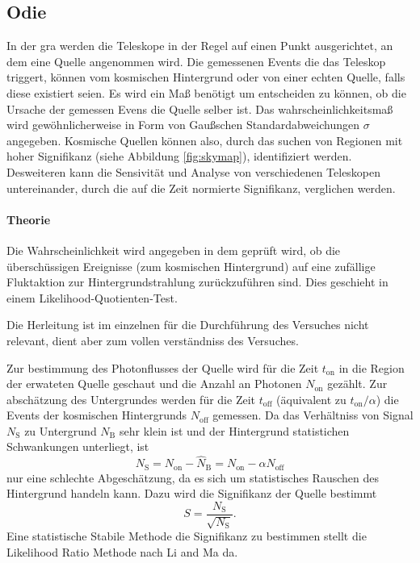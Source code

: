 \subsection{Odie}%
\label{sub:odie}
In der gra werden die Teleskope in der Regel auf einen Punkt 
ausgerichtet, an dem eine Quelle angenommen wird.
Die gemessenen Events die das Teleskop triggert, können vom 
kosmischen Hintergrund oder von einer echten Quelle, falls diese existiert seien.
Es wird ein Maß benötigt um entscheiden zu können, 
ob die Ursache der gemessen Evens die Quelle selber ist.
Das wahrscheinlichkeitsmaß wird gewöhnlicherweise in Form von Gaußschen
Standardabweichungen $\sigma$ angegeben. 
Kosmische Quellen können also, 
durch das suchen von Regionen mit hoher Signifikanz (siehe 
Abbildung \ref{fig:skymap}),
identifiziert werden.
Desweiteren kann die Sensivität und Analyse von verschiedenen 
Teleskopen untereinander,
durch die auf die Zeit normierte Signifikanz,
verglichen werden.

\paragraph{Theorie}%
Die Wahrscheinlichkeit wird angegeben in dem geprüft wird, ob die überschüssigen
Ereignisse (zum kosmischen Hintergrund)  auf eine zufällige Fluktaktion zur
Hintergrundstrahlung zurückzuführen sind.
Dies geschieht in einem Likelihood-Quotienten-Test.

Die Herleitung ist im einzelnen für die Durchführung des 
Versuches nicht relevant, 
dient aber zum vollen verständniss des Versuches.

Zur bestimmung des Photonflusses der Quelle wird für die Zeit $t_\text{on}$ in die Region der
erwateten Quelle geschaut und die Anzahl an Photonen $N_\text{on}$ gezählt.
Zur abschätzung des Untergrundes werden für die Zeit $t_\text{off}$ 
(äquivalent zu $t_\text{on} / \alpha$)
die Events der kosmischen Hintergrunds $N_\text{off}$ gemessen.
Da das Verhältniss von Signal $N_\text{S}$ zu Untergrund 
$N_\text{B}$ sehr klein ist 
und der Hintergrund statistichen Schwankungen unterliegt,
ist 
\begin{equation}
	N_\text{S} = N_\text{on} - \hat{N}_\text{B} = N_\text{on} - \alpha N_\text{off}
\end{equation}
nur eine schlechte Abgeschätzung, da es sich um statistisches Rauschen des
Hintergrund handeln kann.
Dazu wird die Signifikanz der Quelle bestimmt
\begin{equation}
	S = \frac{N_\text{S}}{\sqrt{N_\text{S}}} .
\end{equation}
Eine statistische Stabile Methode die Signifikanz zu bestimmen stellt die
Likelihood Ratio Methode nach Li and Ma da.


